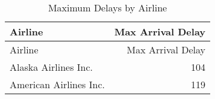 \documentclass{article}
\begin{document}
\begin{longtable}[]{@{}lr@{}}
\caption{\label{tab:maxdelays}Maximum Delays by Airline}\tabularnewline
\toprule
Airline & Max Arrival Delay \\
\midrule
\endfirsthead
\toprule
Airline & Max Arrival Delay \\
\midrule
\endhead
Alaska Airlines Inc. & 104 \\
American Airlines Inc. & 119 \\
\bottomrule
\end{longtable}
\end{document}
